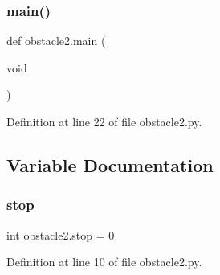 \subsubsection{\texorpdfstring{main()}{main()}}
{\footnotesize\ttfamily def obstacle2.\+main (\begin{DoxyParamCaption}\item[{void}]{ }\end{DoxyParamCaption})}



Definition at line 22 of file obstacle2.\+py.



\subsection{Variable Documentation}
\mbox{\label{namespaceobstacle2_a2f6f47a409c258af81e2ec3691fda67a}} 
\subsubsection{\texorpdfstring{stop}{stop}}
{\footnotesize\ttfamily int obstacle2.\+stop = 0}



Definition at line 10 of file obstacle2.\+py.

